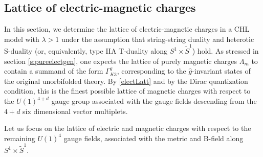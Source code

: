 \documentclass[a4paper,11pt]{article}
\numberwithin{equation}{section}
\begin{document}
\subsection{Lattice of electric-magnetic charges}\label{s:genlatticeem}

In this section, we determine the lattice of electric-magnetic charges in a CHL model with $\lambda>1$ under the assumption that string-string duality and heterotic S-duality (or, equivalently, type IIA T-duality along $S^1\times \tilde S^1$) hold. As stressed in section \eqref{s:pureelectgen}, one expects the lattice of purely magnetic charges $\Lambda_m$ to contain a summand of the form $\Gamma_{K3}^g$, corresponding to the $\hat g$-invariant states of the original unorbifolded theory. By \eqref{electLatt} and by the Dirac quantization condition, this is the finest possible lattice of magnetic charges with respect to the $U(1)^{4+d}$ gauge group associated with the gauge fields descending from the  ${4+d}$ six dimensional vector multiplets. 

Let us focus on the lattice of electric and magnetic charges with respect to the remaining $U(1)^4$ gauge fields, associated with the metric and B-field along $S^1\times \tilde S^1$.
\end{document}
